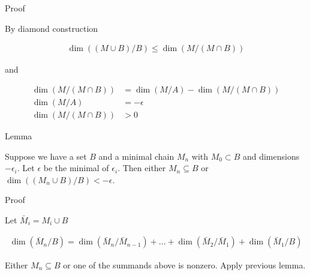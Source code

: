 \documentclass{amsart}
\begin{document}
Proof

By diamond construction

\begin{align*}
	\dim((M \cup B)/B) \leq \dim(M / (M \cap B))
\end{align*}

and 

\begin{align*}
	\dim(M / (M \cap B)) &= \dim (M/A) - \dim(M / (M \cap B)) \\
	\dim (M/A) &= -\epsilon \\
	\dim(M / (M \cap B)) &> 0
\end{align*}


Lemma

Suppose we have a set $B$ and a minimal chain $M_n$ with $M_0 \subset B$ and dimensions $-\epsilon_i$.
Let $\epsilon$ be the minimal of $\epsilon_i$.
Then either $M_n \subseteq B$ or $\dim((M_n \cup B)/B) < -\epsilon$.

Proof

Let $\bar M_i = M_i \cup B$

\begin{align*}
	\dim(\bar M_n/B) = \dim(\bar M_n/\bar M_{n-1}) + \ldots + \dim(\bar M_2/\bar M_1) + \dim(\bar M_1/B)
\end{align*}

Either $M_n \subseteq B$ or one of the summands above is nonzero.
Apply previous lemma.
\end{document}
